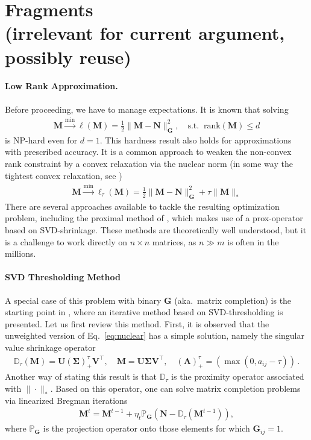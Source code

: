 \documentclass{article}
\newcommand{\mN}{{\mathbf N}}
\newcommand{\mM}{{\mathbf M}}
\newcommand{\mG}{{\mathbf G}}
\newcommand{\mA}{{\mathbf A}}
\newcommand{\mSigma}{{\mathbf \Sigma}}
\begin{document}
\newpage

\section{Fragments \\(irrelevant for current argument, possibly reuse)}


\paragraph{Low Rank Approximation.} 
Before proceeding, we have to manage expectations. It is known that solving 
\begin{align}
\mM \stackrel{\min}{\longrightarrow} \ell(\mM) = \tfrac 12 \| \mM - \mN \|^2_\mG, \quad \text{s.t.} \;\; \text{rank}(\mM) \le d
\end{align}
is NP-hard \cite{gillis2011low} even for $d=1$. This hardness result also holds for approximations with prescribed accuracy. 
%
It is a common approach to weaken the non-convex rank constraint by a convex relaxation via the nuclear norm (in some way the tightest convex relaxation, see \cite[Eq.~(1.1)]{cai2010singular})
\begin{align}
\mM \stackrel{\min}{\longrightarrow} \ell_\tau(\mM) = \tfrac12 \| \mM - \mN \|^2_\mG + \tau \| \mM \|_*
\label{eq:nuclear} 
\end{align}
There are several approaches available to tackle the resulting optimization problem, including the proximal method of \cite{cai2010singular}, which makes use of a prox-operator based on SVD-shrinkage. These methods are theoretically well understood, but it is a challenge to work directly on $n\times n$ matrices, as $n \gg m$ is often in the millions. \\

\paragraph{SVD Thresholding Method} 
A special case of this problem with binary $\mG$ (aka.~matrix completion) is the starting point  in \cite{cai2010singular}, where an iterative method based on SVD-thresholding is presented. Let us first review this method. First, it is observed that the unweighted version of Eq.~\eqref{eq:nuclear} has a simple solution, namely the {singular value shrinkage operator}
\begin{align}
\mathbb D_\tau(\mM) = \mathbf U (\mSigma)^{\tau}_{+} \mathbf V^\top, \quad \mM = \mathbf U \mSigma \mathbf V^\top, \quad (\mA)_+^\tau = (\max(0,a_{ij}-\tau))\,.
\end{align}
Another way of stating this result is that $\mathbb D_\tau$ is the proximity operator associated with $\| \cdot\|_*$. Based on this operator, one can solve matrix completion problems via linearized Bregman iterations
\begin{align}
\mM^t = \mM^{t-1} + \eta_t \mathbb P_{\mG}  (\mN - \mathbb D_\tau(\mM^{t-1})),
\end{align}
where $\mathbb P_\mG$ is the projection operator onto those elements for which $\mG_{ij}=1$.
\end{document}
